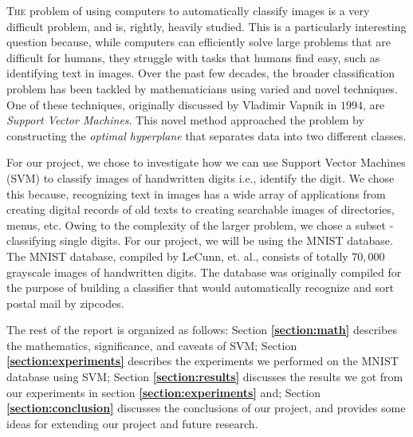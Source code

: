 
\lettrine[nindent=0em,lines=2]{T}{he} problem of using computers to automatically classify images is a very difficult problem, and is, rightly, heavily studied. This is a particularly interesting question because, while computers can efficiently solve large problems that are difficult for humans, they struggle with tasks that humans find easy, such as identifying text in images. Over the past few decades, the broader classification problem has been tackled by mathematicians using varied and novel techniques. One of these techniques, originally discussed by Vladimir Vapnik in $1994$, are \textit{Support Vector Machines}\cite{statistical-learning}. This novel method approached the problem by constructing the \textit{optimal hyperplane} that separates data into two different classes.

For our project, we chose to investigate how we can use Support Vector Machines (SVM) to classify images of handwritten digits i.e., identify the digit. We chose this because, recognizing text in images has a wide array of applications from creating digital records of old texts to creating searchable images of directories, menus, etc. Owing to the complexity of the larger problem, we chose a subset - classifying single digits. For our project, we will be using the MNIST database\cite{mnist}. The MNIST database, compiled by LeCunn, et. al., consists of totally $70,000$ grayscale images of handwritten digits. The database was originally compiled for the purpose of building a classifier that would automatically recognize and sort postal mail by zipcodes.

The rest of the report is organized as follows: Section \textbf{\ref{section:math}} describes the mathematics, significance, and caveats of SVM; Section \textbf{\ref{section:experiments}} describes the experiments we performed on the MNIST database using SVM; Section \textbf{\ref{section:results}} discusses the results we got from our experiments in section \textbf{\ref{section:experiments}} and; Section \textbf{\ref{section:conclusion}} discusses the conclusions of our project, and provides some ideas for extending our project and future research.